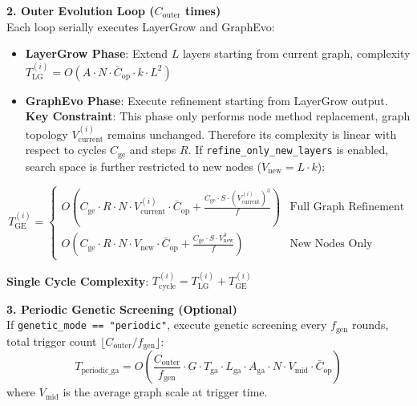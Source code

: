 \textbf{2. Outer Evolution Loop ($C_{\mathrm{outer}}$ times)} \\
Each loop serially executes LayerGrow and GraphEvo:
\begin{itemize}
    \item \textbf{LayerGrow Phase}: Extend $L$ layers starting from current graph, complexity $T_{\mathrm{LG}}^{(i)} = O(A \cdot N \cdot \bar{C}_{\mathrm{op}} \cdot k \cdot L^2)$
    \item \textbf{GraphEvo Phase}: Execute refinement starting from LayerGrow output. \textbf{Key Constraint}: This phase only performs node method replacement, graph topology $V_{\mathrm{current}}^{(i)}$ remains unchanged. Therefore its complexity is linear with respect to cycles $C_{\mathrm{ge}}$ and steps $R$. If \texttt{refine\_only\_new\_layers} is enabled, search space is further restricted to new nodes ($V_{\mathrm{new}} = L \cdot k$):
\end{itemize}
\begin{equation}
    T_{\mathrm{GE}}^{(i)} = 
    \begin{cases}
        O(C_{\mathrm{ge}} \cdot R \cdot N \cdot V_{\mathrm{current}}^{(i)} \cdot \bar{C}_{\mathrm{op}} + \frac{C_{\mathrm{ge}} \cdot S \cdot (V_{\mathrm{current}}^{(i)})^3}{f}) & \text{Full Graph Refinement} \\
        O(C_{\mathrm{ge}} \cdot R \cdot N \cdot V_{\mathrm{new}} \cdot \bar{C}_{\mathrm{op}} + \frac{C_{\mathrm{ge}} \cdot S \cdot V_{\mathrm{new}}^3}{f}) & \text{New Nodes Only}
    \end{cases}
\end{equation}

\textbf{Single Cycle Complexity}: $T_{\mathrm{cycle}}^{(i)} = T_{\mathrm{LG}}^{(i)} + T_{\mathrm{GE}}^{(i)}$

\textbf{3. Periodic Genetic Screening (Optional)} \\
If \texttt{genetic\_mode == "periodic"}, execute genetic screening every $f_{\mathrm{gen}}$ rounds, total trigger count $\lfloor C_{\mathrm{outer}} / f_{\mathrm{gen}} \rfloor$:
\begin{equation}
    T_{\mathrm{periodic\_ga}} = O\left( \frac{C_{\mathrm{outer}}}{f_{\mathrm{gen}}} \cdot G \cdot T_{\mathrm{ga}} \cdot L_{\mathrm{ga}} \cdot A_{\mathrm{ga}} \cdot N \cdot V_{\mathrm{mid}} \cdot \bar{C}_{\mathrm{op}} \right)
\end{equation}
where $V_{\mathrm{mid}}$ is the average graph scale at trigger time.

